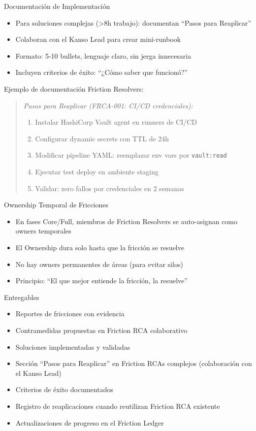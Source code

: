 Documentación de Implementación
\begin{itemize}
    \item Para soluciones complejas (>8h trabajo): documentan ``Pasos para Reaplicar''
    \item Colaboran con el Kanso Lead para crear mini-runbook
    \item Formato: 5-10 bullets, lenguaje claro, sin jerga innecesaria
    \item Incluyen criterios de éxito: ``¿Cómo saber que funcionó?''
\end{itemize}

Ejemplo de documentación Friction Resolvers:
\begin{quote}
\textit{Pasos para Reaplicar (FRCA-001: CI/CD credenciales):}
\begin{enumerate}
    \item Instalar HashiCorp Vault agent en runners de CI/CD
    \item Configurar dynamic secrets con TTL de 24h
    \item Modificar pipeline YAML: reemplazar env vars por \texttt{vault:read}
    \item Ejecutar test deploy en ambiente staging
    \item Validar: zero fallos por credenciales en 2 semanas
\end{enumerate}
\end{quote}

Ownership Temporal de Fricciones
\begin{itemize}
    \item En fases Core/Full, miembros de Friction Resolvers se auto-asignan como owners temporales
    \item El Ownership dura solo hasta que la fricción se resuelve
    \item No hay owners permanentes de áreas (para evitar silos)
    \item Principio: ``El que mejor entiende la fricción, la resuelve''
\end{itemize}

Entregables
\begin{itemize}
    \item Reportes de fricciones con evidencia
    \item Contramedidas propuestas en Friction RCA colaborativo
    \item Soluciones implementadas y validadas
    \item Sección ``Pasos para Reaplicar'' en Friction RCAs complejos (colaboración con el Kanso Lead)
    \item Criterios de éxito documentados
    \item Registro de reaplicaciones cuando reutilizan Friction RCA existente
    \item Actualizaciones de progreso en el Friction Ledger
\end{itemize}

